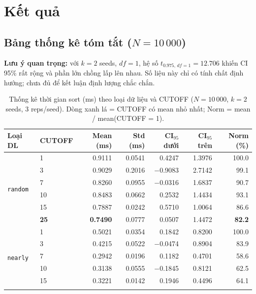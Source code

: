 \documentclass[12pt, a4paper]{article}
\begin{document}
\section{Kết quả}

\subsection{Bảng thống kê tóm tắt ($N = 10\,000$)}

\noindent\textbf{Lưu ý quan trọng:} với $k = 2$ seeds, $df = 1$, hệ số
$t_{0.975,\,df=1} = 12.706$ khiến CI 95\% rất rộng và phần lớn chồng lấp lên nhau.
Số liệu này chỉ có tính chất định hướng; chưa đủ để kết luận định lượng chắc chắn.

\begin{table}[H]
\centering
\caption{Thống kê thời gian sort (ms) theo loại dữ liệu và CUTOFF ($N = 10\,000$,
         $k = 2$ seeds, 3 reps/seed). Dòng \colorbox{bestrow}{xanh lá} = CUTOFF
         có mean nhỏ nhất; Norm = mean / mean(CUTOFF = 1).}
\label{tab:summary}
\small
\renewcommand{\arraystretch}{1.25}
\begin{tabular}{llrrrrr}
\toprule
\textbf{Loại DL} & \textbf{CUTOFF} & \textbf{Mean (ms)} & \textbf{Std (ms)}
                 & \textbf{CI$_{95}$ dưới} & \textbf{CI$_{95}$ trên} & \textbf{Norm (\%)} \\
\midrule
\multirow{6}{*}{\texttt{random}}
& 1  & 0.9111 & 0.0541 & 0.4247 & 1.3976 & 100.0 \\
& 3  & 0.9029 & 0.2016 & $-$0.9083 & 2.7142 & 99.1 \\
& 7  & 0.8260 & 0.0955 & $-$0.0316 & 1.6837 & 90.7 \\
& 10 & 0.8483 & 0.0662 & 0.2532 & 1.4434 & 93.1 \\
& 15 & 0.7887 & 0.0242 & 0.5710 & 1.0064 & 86.6 \\
\rowcolor{bestrow}
& \textbf{25} & \textbf{0.7490} & 0.0777 & 0.0507 & 1.4472 & \textbf{82.2} \\
\midrule
\multirow{6}{*}{\texttt{nearly}}
& 1  & 0.5021 & 0.0354 & 0.1842 & 0.8200 & 100.0 \\
& 3  & 0.4215 & 0.0522 & $-$0.0474 & 0.8904 & 83.9 \\
& 7  & 0.2942 & 0.0196 & 0.1182 & 0.4701 & 58.6 \\
& 10 & 0.3138 & 0.0555 & $-$0.1845 & 0.8121 & 62.5 \\
& 15 & 0.3221 & 0.0142 & 0.1946 & 0.4496 & 64.1 \\
\rowcolor{bestrow}

\end{tabular}
\end{table}
\end{document}
